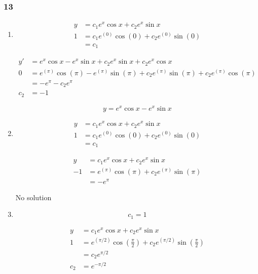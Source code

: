\documentclass{article}
\begin{document}
\subsubsection{13}

\begin{enumerate}
  \item

        \begin{align*}
          y & = c_1 e^x \cos x + c_2 e^x \sin x             \\
          1 & = c_1 e^{(0)} \cos (0) + c_2 e^{(0)} \sin (0) \\
            & = c_1
        \end{align*}

        \begin{align*}
          y'  & = e^x \cos x - e^x \sin x + c_2 e^x \sin x + c_2 e^x \cos x                                         \\
          0   & = e^{(\pi)} \cos (\pi) - e^{(\pi)} \sin (\pi) + c_2 e^{(\pi)} \sin (\pi) + c_2 e^{(\pi)} \cos (\pi) \\
              & = -e^\pi - c_2 e^\pi                                                                                \\
          c_2 & = -1
        \end{align*}

        \[y = e^x \cos x - e^x \sin x\]

  \item

        \begin{align*}
          y & = c_1 e^x \cos x + c_2 e^x \sin x             \\
          1 & = c_1 e^{(0)} \cos (0) + c_2 e^{(0)} \sin (0) \\
            & = c_1
        \end{align*}

        \begin{align*}
          y  & = c_1 e^x \cos x + c_2 e^x \sin x                 \\
          -1 & = e^{(\pi)} \cos (\pi) + c_2 e^{(\pi)} \sin (\pi) \\
             & = -e^\pi
        \end{align*}

        No solution

  \item

        \[c_1 = 1\]

        \begin{align*}
          y   & = c_1 e^x \cos x + c_2 e^x \sin x                                                                       \\
          1   & = e^{(\pi / 2)} \cos \left( \frac{\pi}{2} \right) + c_2 e^{(\pi / 2)} \sin \left( \frac{\pi}{2} \right) \\
              & = c_2 e^{\pi / 2}                                                                                       \\
          c_2 & = e^{-\pi / 2}
        \end{align*}


\end{enumerate}
\end{document}
